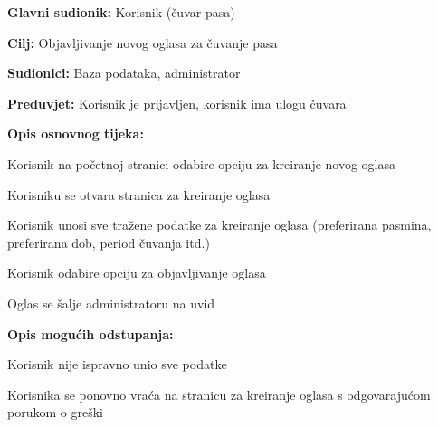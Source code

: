 					\noindent {}
					\begin{packed_item}
						
						\item \textbf{Glavni sudionik: } Korisnik (čuvar pasa)
						\item  \textbf{Cilj:} Objavljivanje novog oglasa  za čuvanje pasa
						\item  \textbf{Sudionici:} Baza podataka, administrator
						\item  \textbf{Preduvjet:} Korisnik je prijavljen, korisnik ima ulogu čuvara
						\item  \textbf{Opis osnovnog tijeka:}
						
						\item[] \begin{packed_enum}
							
							\item Korisnik na početnoj stranici odabire opciju za kreiranje novog oglasa     
							\item Korisniku se otvara stranica za kreiranje oglasa  
							\item Korisnik unosi sve tražene podatke za kreiranje oglasa   (preferirana pasmina, preferirana dob, period čuvanja itd.)
							\item Korisnik odabire opciju za objavljivanje oglasa
							\item Oglas se šalje administratoru na uvid
							
						\end{packed_enum}
						
						\item  \textbf{Opis mogućih odstupanja:}
						
						\item[] \begin{packed_item}
							
							\item[4.a] Korisnik nije ispravno unio sve podatke
							\item[] \begin{packed_enum}
								
								\item Korisnika se ponovno vraća na stranicu za kreiranje oglasa s odgovarajućom porukom o greški 
								
							\end{packed_enum}
						\end{packed_item}
					\end{packed_item}	
				
